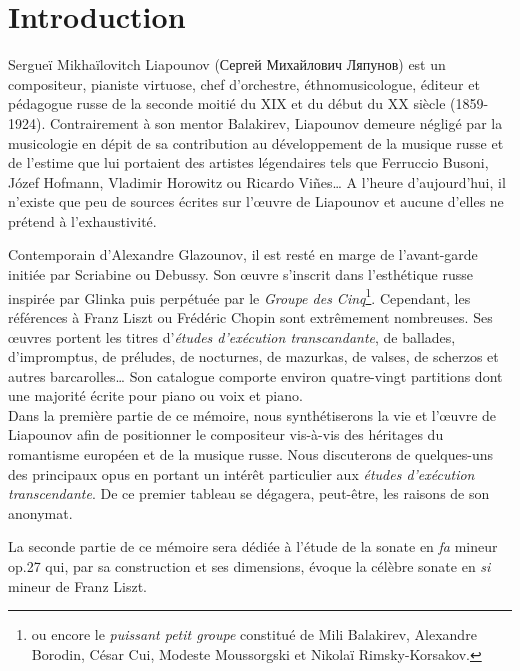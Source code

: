 
\chapter{Introduction}

Sergueï Mikhaïlovitch Liapounov (\foreignlanguage{russian}{Сергей Михайлович Ляпунов}) est un compositeur, pianiste virtuose, chef d'orchestre, éthnomusicologue, éditeur et pédagogue russe de la seconde moitié du XIX\ieme{} et du début du XX\ieme{} siècle (1859-1924). Contrairement à son mentor Balakirev, Liapounov demeure négligé par la musicologie en dépit de sa contribution au développement de la musique russe et de l'estime que lui portaient des artistes légendaires tels que Ferruccio Busoni, Józef Hofmann, Vladimir Horowitz ou Ricardo Vi\~{n}es\dots{} A l'heure d'aujourd'hui, il n'existe que peu de sources écrites sur l'œuvre de Liapounov et aucune d'elles ne prétend à l'exhaustivité.

Contemporain d'Alexandre Glazounov, il est resté en marge de l'avant-garde initiée par Scriabine ou Debussy. Son œuvre s'inscrit dans l’esthétique russe inspirée par Glinka puis perpétuée par le \emph{Groupe des Cinq}\footnote{ou encore le \emph{puissant petit groupe} constitué de Mili Balakirev, Alexandre Borodin, César Cui, Modeste Moussorgski et Nikolaï Rimsky-Korsakov.}. Cependant, les références à Franz Liszt ou Frédéric Chopin sont extrêmement nombreuses. Ses œuvres portent les titres d'\emph{études d'exécution transcandante}, de ballades, d'impromptus, de préludes, de nocturnes, de mazurkas, de valses, de scherzos et autres barcarolles\dots{} Son catalogue comporte environ quatre-vingt partitions dont une majorité écrite pour piano ou voix et piano.\\

Dans la première partie de ce mémoire, nous synthétiserons la vie et l'œuvre de Liapounov afin de positionner le compositeur vis-à-vis des héritages du romantisme européen et de la musique russe. Nous discuterons de quelques-uns des principaux opus en portant un intérêt particulier aux \emph{études d'exécution transcendante}. De ce premier tableau se dégagera, peut-être, les raisons de son anonymat.

La seconde partie de ce mémoire sera dédiée à l'étude de la sonate en \emph{fa} mineur op.27 qui, par sa construction et ses dimensions, évoque la célèbre sonate en \emph{si} mineur de Franz Liszt.

